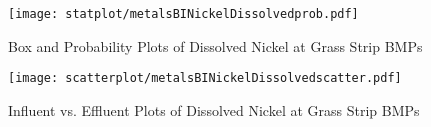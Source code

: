         \begin{figure}[hb]   %
            \centering
            \texttt{[image: statplot/metalsBINickelDissolvedprob.pdf]}
            \caption{Box and Probability Plots of Dissolved Nickel at Grass Strip BMPs}
        \end{figure}         %
        
        
        \begin{figure}[hb]   %
            \centering
            \texttt{[image: scatterplot/metalsBINickelDissolvedscatter.pdf]}
            \caption{Influent vs. Effluent Plots of Dissolved Nickel at Grass Strip BMPs}
        \end{figure}         %
        \clearpage
        